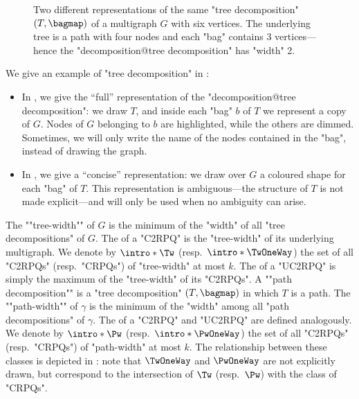 \begin{figure}
	\centering
	\hfill
	\caption{
		\AP\label{fig:ex-tree-dec}
		Two different representations of the same "tree decomposition" $(T, \bagmap)$ of a 
		multigraph $G$ with six 
		vertices. The underlying tree is a path with four nodes and each "bag" contains 3 
		vertices---hence the "decomposition@tree decomposition" has "width" 2.
	}
\end{figure}
We give an example of "tree decomposition" in :
\begin{itemize}
	\item In , we give the ``full'' representation of
	the "decomposition@tree decomposition": we draw $T$, and inside each "bag" $b$ of $T$
	we represent a copy of $G$. Nodes of $G$ belonging to $b$ are highlighted, while the others are dimmed. Sometimes, we will only write the
	name of the nodes contained in the "bag", instead of drawing the graph.
	\item In , we give a ``concise'' representation:
	we draw over $G$ a coloured shape for each "bag" of $T$. This representation is ambiguous---the structure of $T$ is not made explicit---and will only be used when no ambiguity can arise.
\end{itemize}

The \AP""tree-width"" of $G$ is the minimum of the "width" of all "tree decompositions" of $G$. The  of a "C2RPQ" is the "tree-width" of its underlying multigraph. 
We denote by $\intro*\Tw$ (resp.\ $\intro*\TwOneWay$) the set of all "C2RPQs" (resp.\ "CRPQs") of "tree-width" at most $k$. The  of a "UC2RPQ" is simply the maximum of the "tree-width" of its "C2RPQs".
\AP
A ""path decomposition"" is a "tree decomposition" $(T,\bagmap)$ in which $T$ is a path. The \AP""path-width"" of $\gamma$ is the minimum of the "width" among all "path decompositions" of $\gamma$. The  of a "C2RPQ" and "UC2RPQ" are defined analogously. We denote by \AP$\intro*\Pw$ (resp.\ $\intro*\PwOneWay$) the set of all "C2RPQs" (resp.\ "CRPQs") of "path-width" at most $k$. The relationship between these classes is depicted in :
note that $\TwOneWay$ and $\PwOneWay$ are not explicitly drawn, but correspond to the
intersection of $\Tw$ (resp.\ $\Pw$) with the class of "CRPQs".

